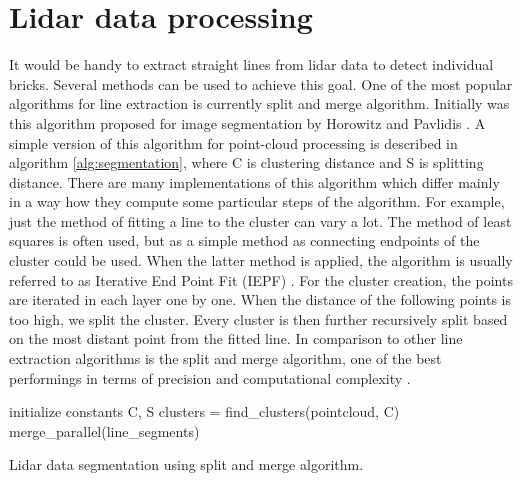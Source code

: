\section{Lidar data processing}

It would be handy to extract straight lines from lidar data to detect individual bricks. Several methods can be used to achieve this goal. One of the most popular algorithms for line extraction is currently split and merge algorithm. Initially was this algorithm proposed for image segmentation by Horowitz and Pavlidis \cite{horowitz1976}. A simple version of this algorithm for point-cloud processing is described in algorithm \ref{alg:segmentation}, where C is clustering distance and S is splitting distance. There are many implementations of this algorithm which differ mainly in a way how they compute some particular steps of the algorithm. For example, just the method of fitting a line to the cluster can vary a lot. The method of least squares is often used, but as a simple method as connecting endpoints of the cluster could be used. When the latter method is applied, the algorithm is usually referred to as Iterative End Point Fit (IEPF) \cite{siadat1997}. For the cluster creation, the points are iterated in each layer one by one. When the distance of the following points is too high, we split the cluster. Every cluster is then further recursively split based on the most distant point from the fitted line. In comparison to other line extraction algorithms is the split and merge algorithm, one of the best performings in terms of precision and computational complexity \cite{nguyen2006}.
\begin{algorithm}[]
initialize constants C, S\;
  clusters = find\_clusters(pointcloud, C)\;
merge\_parallel(line\_segments)\;
 
 \caption{Lidar data segmentation using split and merge algorithm.}
 \label{alg:segmentation}
\end{algorithm}


